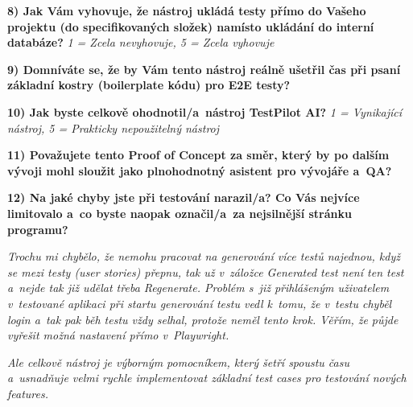 \documentclass[czech, ing, kiv, he, iso690numb, viewonly]{fasthesis}
\begin{document}
\begin{tcolorbox}[breakable, colback=gray!3, colframe=black!35, boxrule=0.4pt, arc=2pt, title={Google Forms - export odpovědi}]
 \quad {} \quad {} \quad {} \quad {}

\textbf{8) Jak Vám vyhovuje, že nástroj ukládá testy přímo do Vašeho projektu (do specifikovaných složek) namísto ukládání do interní databáze?}
\textit{1 = Zcela nevyhovuje, 5 = Zcela vyhovuje}

 \quad {} \quad {} \quad {} \quad {}

\textbf{9) Domníváte se, že by Vám tento nástroj reálně ušetřil čas při psaní základní kostry (boilerplate kódu) pro E2E testy?}

 \quad {} \quad {} \quad {}

\textbf{10) Jak byste celkově ohodnotil/a~nástroj TestPilot AI?}
\textit{1 = Vynikající nástroj, 5 = Prakticky nepoužitelný nástroj}

 \quad {} \quad {} \quad {} \quad {}

\textbf{11) Považujete tento Proof of Concept za směr, který by po dalším vývoji mohl sloužit jako plnohodnotný asistent pro vývojáře a~QA?}

 \quad {} \quad {} \quad {}

\textbf{12) Na jaké chyby jste při testování narazil/a? Co Vás nejvíce limitovalo a~co byste naopak označil/a~za nejsilnější stránku programu?}

\textit{Trochu mi chybělo, že nemohu pracovat na generování více testů najednou, když se mezi testy (user stories) přepnu, tak už v~záložce Generated test není ten test a~nejde tak již udělat třeba Regenerate. Problém s~již přihlášeným uživatelem v~testované aplikaci při startu generování testu vedl k~tomu, že v~testu chyběl login a~tak pak běh testu vždy selhal, protože neměl tento krok. Věřím, že půjde vyřešit možná nastavení přímo v~Playwright.}

\textit{Ale celkově nástroj je výborným pomocníkem, který šetří spoustu času a~usnadňuje velmi rychle implementovat základní test cases pro testování nových features.}

\end{tcolorbox}
\end{document}

